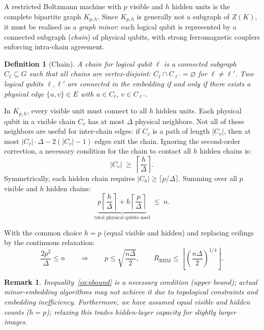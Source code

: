 \documentclass[11pt,a4paper]{article}
\newtheorem{definition}{Definition}
\newtheorem{remark}{Remark}
\begin{document}
A restricted Boltzmann machine with $p$ visible and $h$ hidden units is the complete bipartite graph $K_{p,h}$.  Since $K_{p,h}$ is generally not a subgraph of $Z(K)$, it must be realised as a \emph{graph minor}: each logical qubit is represented by a connected subgraph (\emph{chain}) of physical qubits, with strong ferromagnetic couplers enforcing intra-chain agreement.

\begin{definition}[Chain]
A \emph{chain} for logical qubit $\ell$ is a connected subgraph $C_\ell \subseteq G$ such that all chains are vertex-disjoint: $C_\ell \cap C_{\ell'} = \varnothing$ for $\ell\neq\ell'$.  Two logical qubits $\ell,\ell'$ are connected in the embedding if and only if there exists a physical edge $\{u,v\}\in E$ with $u\in C_\ell$, $v\in C_{\ell'}$.
\end{definition}

In $K_{p,h}$, every visible unit must connect to all $h$ hidden units.  Each physical qubit in a visible chain $C_v$ has at most $\Delta$ physical neighbors.  Not all of these neighbors are useful for inter-chain edges: if $C_v$ is a path of length $|C_v|$, then at most $|C_v|\cdot\Delta - 2(|C_v|-1)$ edges exit the chain.  Ignoring the second-order correction, a necessary condition for the chain to contact all $h$ hidden chains is:
\begin{equation}\label{eq:chainlb}
  |C_v| \;\geq\; \left\lceil \frac{h}{\Delta} \right\rceil.
\end{equation}
Symmetrically, each hidden chain requires $|C_h| \geq \lceil p/\Delta \rceil$.  Summing over all $p$ visible and $h$ hidden chains:
\begin{equation}\label{eq:embub}
  \underbrace{p\left\lceil \frac{h}{\Delta}\right\rceil + h\left\lceil \frac{p}{\Delta}\right\rceil}_{\text{total physical qubits used}} \;\leq\; n.
\end{equation}

With the common choice $h = p$ (equal visible and hidden) and replacing ceilings by the continuous relaxation:
\begin{equation}\label{eq:pbound}
  \frac{2p^2}{\Delta} \leq n
  \qquad\Longrightarrow\qquad
  p \leq \sqrt{\frac{n\Delta}{2}},
  \qquad
  R_{\mathrm{RBM}} \leq \left\lfloor\left(\frac{n\Delta}{2}\right)^{1/4}\right\rfloor.
\end{equation}

\begin{remark}
Inequality~\eqref{eq:pbound} is a \emph{necessary condition} (upper bound); actual minor-embedding algorithms may not achieve it due to topological constraints and embedding inefficiency.  Furthermore, we have assumed equal visible and hidden counts ($h=p$); relaxing this trades hidden-layer capacity for slightly larger images.
\end{remark}
\end{document}
